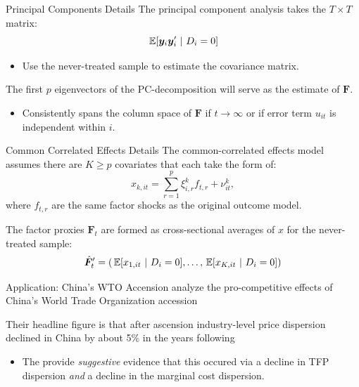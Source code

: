 \documentclass[aspectratio=169,t,11pt]{beamer}
\begin{document}
\begin{frame}{Principal Components Details}\label{slide:appendix-pc_details}
  The principal component analysis takes the $T \times T$ matrix:
  $$
    \expec{\bm{y}_i \bm{y}_i'}{D_i = 0}
  $$
  \vspace{-\medskipamount}
  \begin{itemize}
    \item Use the never-treated sample to estimate the covariance matrix.
  \end{itemize}

  \bigskip
  The first $p$ eigenvectors of the PC-decomposition will serve as the estimate of $\bm{F}$.
  \begin{itemize}
    \item Consistently spans the column space of $\bm{F}$ if $t \to \infty$ or if error term $u_{it}$ is independent within $i$.
  \end{itemize}

\end{frame}

\begin{frame}{Common Correlated Effects Details}\label{slide:appendixcce_details}
  The common-correlated effects model assumes there are $K \geq p$ covariates that each take the form of:
  $$
    x_{k,it} = \sum_{r = 1}^p \xi^k_{i,r} f_{t, r} + \nu^k_{it},
  $$
  where $f_{t,r}$ are the same factor shocks as the original outcome model. 

  \medskip
  The factor proxies $\bm{F}_t$ are formed as cross-sectional averages of $x$ for the never-treated sample:
  $$
    \hat{\bm{F}}_t' = \left( \expec{x_{1,it}}{D_i = 0}, \dots, \expec{x_{K,it}}{D_i = 0} \right)
  $$

\end{frame}

\begin{frame}{Application: China's WTO Accension}\label{slide:appendix-wto_application}
  \citet{lu2015trade} analyze the pro-competitive effects of China's World Trade Organization accession

  \bigskip
  Their headline figure is that after ascension industry-level price dispersion declined in China by about 5\% in the years following
  \begin{itemize}
    \item The provide \emph{suggestive} evidence that this occured via a decline in TFP dispersion \emph{and} a decline in the marginal cost dispersion.
  \end{itemize}

\end{frame}
\end{document}
